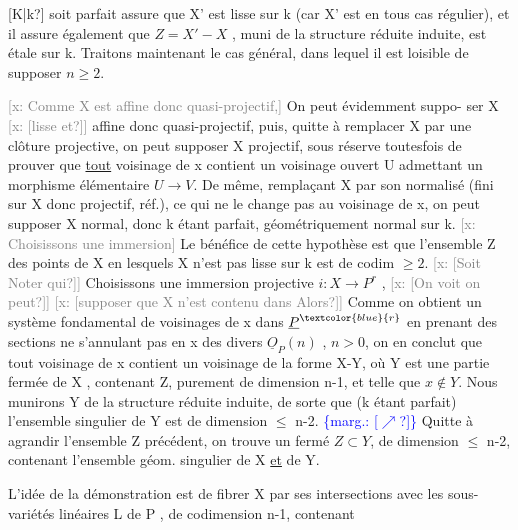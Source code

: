\documentclass[11pt]{article}
\newcommand{\scanpage}[1]{\par\bigskip\noindent{\small\sffamily[scan #1]}\par}
\newcommand{\mspage}[1]{{\small\sffamily[p.\,#1]}}
\newcommand{\hand}[1]{\textcolor{blue}{#1}}
\newcommand{\margin}[1]{\textcolor{blue}{\{\textsf{marg.:} #1\}}}
\newcommand{\xout}[1]{\textcolor{gray}{[\textsf{x:} #1]}}
\newcommand{\uline}[1]{\underline{#1}}
\newcommand{\unsure}[1]{[#1?]}
\begin{document}
\mspage{75}

\clearpage
\scanpage{25/76}
\mspage{71}

\unsure{K|k} soit parfait assure que X' est lisse sur k (car X' est en tous cas
régulier), et il assure également que $Z = X' - X$ , muni de la structure
réduite induite, est étale sur k. Traitons maintenant le cas général,
dans lequel il est loisible de supposer $n \geqslant 2$.

\xout{Comme X est affine donc quasi-projectif,} On peut évidemment suppo-%
ser X \xout{\unsure{lisse et}} affine donc quasi-projectif, puis, quitte à remplacer X
par une clôture projective, on peut supposer X projectif, sous réserve
toutesfois de prouver que \uline{tout} voisinage de x contient un voisinage
ouvert U admettant un morphisme élémentaire $U \to V$. De même, remplaçant
X par son normalisé (fini sur X donc projectif, réf.), ce qui ne le
change pas au voisinage de x, on peut supposer X normal, donc k étant
parfait, géométriquement normal sur k. \xout{Choisissons une immersion} Le
bénéfice de cette hypothèse est que l'ensemble Z des points de X en
lesquels X n'est pas lisse sur k est de codim $\geqslant 2$. \xout{\unsure{Soit Noter qui}}
Choisissons une immersion projective $i : X \longrightarrow P^r$ , \xout{\unsure{On voit on peut}}
\xout{\unsure{supposer que X n'est contenu dans Alors}} Comme on obtient un système
fondamental de voisinages de x dans $\underline{P}^{\hand{r}}$ en prenant des sections ne
s'annulant pas en x des divers $\underline{O}_P(n)$ , $n > 0$, on en conclut que tout
voisinage de x contient un voisinage de la forme X-Y, où Y est une
partie fermée de X , contenant Z, purement de dimension n-1, et telle que
$x \notin Y$. Nous munirons Y de la structure réduite induite, de sorte que
(k étant parfait) l'ensemble singulier de Y est de dimension $\leqslant$ n-2. \margin{\unsure{$\nearrow$}}
Quitte à agrandir l'ensemble Z précédent, on trouve un fermé $Z \subset Y$, de
dimension $\leqslant$ n-2, contenant l'ensemble géom. singulier de X \uline{et} de Y.

L'idée de la démonstration est de fibrer X par ses intersections
avec les sous-variétés linéaires L de P , de codimension n-1, contenant

\mspage{76}
\end{document}
